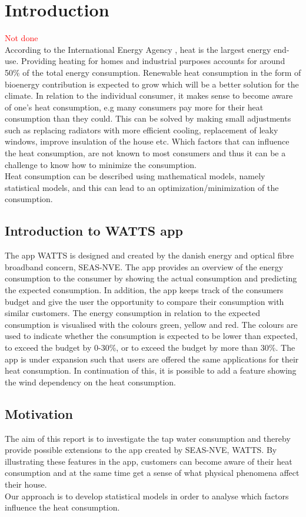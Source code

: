 \chapter{Introduction}
\textcolor{red}{Not done} \\

\noindent According to the International Energy Agency \cite{iea}, heat is the largest energy end-use. Providing heating for homes and industrial purposes accounts for around 50\% of the total energy consumption. Renewable heat consumption in the form of bioenergy contribution is expected to grow which will be a better solution for the climate. In relation to the individual consumer, it makes sense to become aware of one's heat consumption, e.g many consumers pay more for their heat consumption than they could. This can be solved by making small adjustments such as replacing radiators with more efficient cooling, replacement of leaky windows, improve insulation of the house etc. Which factors that can influence the heat consumption, are not known to most consumers and thus it can be a challenge to know how to minimize the consumption. \\

\noindent Heat consumption can be described using mathematical models, namely statistical models, and this can lead to an optimization/minimization of the consumption.

\section{Introduction to WATTS app}
The app WATTS is designed and created by the danish energy and optical fibre broadband concern, SEAS-NVE. The app provides an overview of the energy consumption to the consumer by showing the actual consumption and predicting the expected consumption. In addition, the app keeps track of the consumers budget and give the user the opportunity to compare their consumption with similar customers. The energy consumption in relation to the expected consumption is visualised with the colours green, yellow and red. The colours are used to indicate whether the consumption is expected to be lower than expected, to exceed the budget by 0-30\%, or to exceed the budget by more than 30\%.
\noindent The app is under expansion such that users are offered the same applications for their heat consumption. In continuation of this, it is possible to add a feature showing the wind dependency on the heat consumption.

\section{Motivation}
The aim of this report is to investigate the tap water consumption and thereby provide possible extensions to the app created by SEAS-NVE, WATTS. By illustrating these features in the app, customers can become aware of their heat consumption and at the same time get a sense of what physical phenomena affect their house. \\

\noindent Our approach is to develop statistical models in order to analyse which factors influence the heat consumption.
